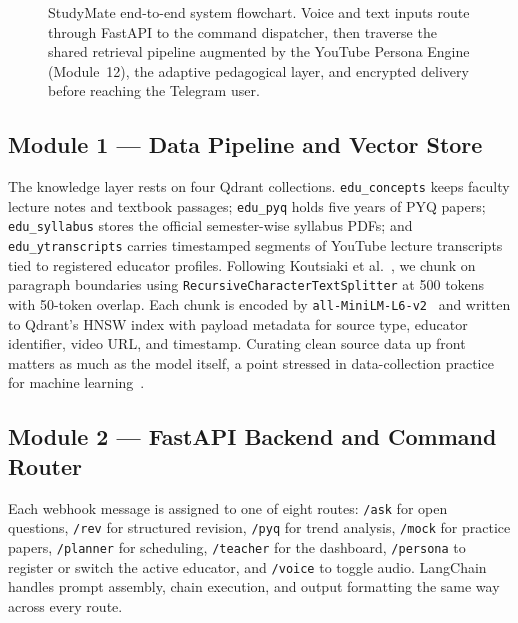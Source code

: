 \documentclass[conference]{IEEEtran}
\begin{document}
\begin{figure}[!t]
{%
}
\caption{StudyMate end-to-end system flowchart. Voice and text inputs
route through FastAPI to the command dispatcher, then traverse the
shared retrieval pipeline augmented by the YouTube Persona Engine
(Module~12), the adaptive pedagogical layer, and encrypted delivery
before reaching the Telegram user.}
\label{fig:flowchart}
\end{figure}
\subsection{Module 1 --- Data Pipeline and Vector Store}
The knowledge layer rests on four Qdrant collections.
\texttt{edu\_concepts} keeps faculty lecture notes and textbook
passages; \texttt{edu\_pyq} holds five years of PYQ papers;
\texttt{edu\_syllabus} stores the official semester-wise syllabus PDFs;
and \texttt{edu\_ytranscripts} carries timestamped segments of YouTube
lecture transcripts tied to registered educator profiles. Following
Koutsiaki et al.~\cite{koutsiaki2025}, we chunk on paragraph
boundaries using \texttt{RecursiveCharacterTextSplitter} at 500 tokens
with 50-token overlap. Each chunk is encoded by
\texttt{all-MiniLM-L6-v2}~\cite{teixeira2025} and written to Qdrant's
HNSW index with payload metadata for source type, educator identifier,
video URL, and timestamp. Curating clean source data up front matters
as much as the model itself, a point stressed in data-collection
practice for machine learning~\cite{roh2021}.
\subsection{Module 2 --- FastAPI Backend and Command Router}
Each webhook message is assigned to one of eight routes: \texttt{/ask}
for open questions, \texttt{/rev} for structured revision, \texttt{/pyq}
for trend analysis, \texttt{/mock} for practice papers, \texttt{/planner}
for scheduling, \texttt{/teacher} for the dashboard, \texttt{/persona}
to register or switch the active educator, and \texttt{/voice} to
toggle audio. LangChain handles prompt assembly, chain execution, and
output formatting the same way across every route.
\end{document}

